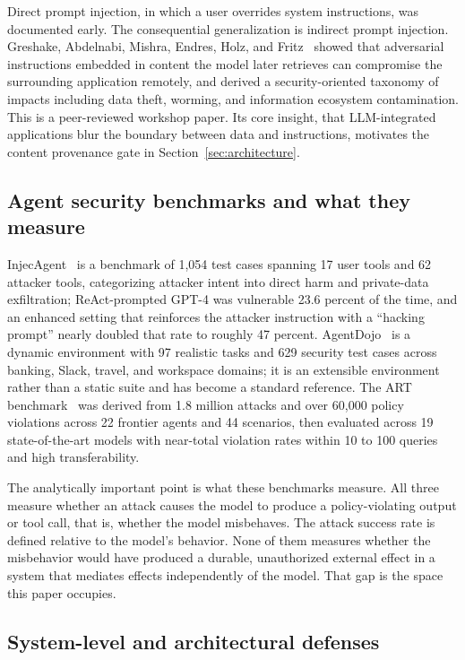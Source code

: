\documentclass[11pt,letterpaper]{article}
\begin{document}
Direct prompt injection, in which a user overrides system instructions, was documented early. The consequential generalization is indirect prompt injection. Greshake, Abdelnabi, Mishra, Endres, Holz, and Fritz~\cite{greshake2023} showed that adversarial instructions embedded in content the model later retrieves can compromise the surrounding application remotely, and derived a security-oriented taxonomy of impacts including data theft, worming, and information ecosystem contamination. This is a peer-reviewed workshop paper. Its core insight, that LLM-integrated applications blur the boundary between data and instructions, motivates the content provenance gate in Section~\ref{sec:architecture}.

\subsection{Agent security benchmarks and what they measure}\label{sec:related-benchmarks}

InjecAgent~\cite{zhan2024} is a benchmark of 1,054 test cases spanning 17 user tools and 62 attacker tools, categorizing attacker intent into direct harm and private-data exfiltration; ReAct-prompted GPT-4 was vulnerable 23.6 percent of the time, and an enhanced setting that reinforces the attacker instruction with a ``hacking prompt'' nearly doubled that rate to roughly 47 percent. AgentDojo~\cite{debenedetti2024} is a dynamic environment with 97 realistic tasks and 629 security test cases across banking, Slack, travel, and workspace domains; it is an extensible environment rather than a static suite and has become a standard reference. The ART benchmark~\cite{zou2025} was derived from 1.8 million attacks and over 60,000 policy violations across 22 frontier agents and 44 scenarios, then evaluated across 19 state-of-the-art models with near-total violation rates within 10 to 100 queries and high transferability.

The analytically important point is what these benchmarks measure. All three measure whether an attack causes the model to produce a policy-violating output or tool call, that is, whether the model misbehaves. The attack success rate is defined relative to the model's behavior. None of them measures whether the misbehavior would have produced a durable, unauthorized external effect in a system that mediates effects independently of the model. That gap is the space this paper occupies.

\subsection{System-level and architectural defenses}\label{sec:related-systems}
\end{document}
